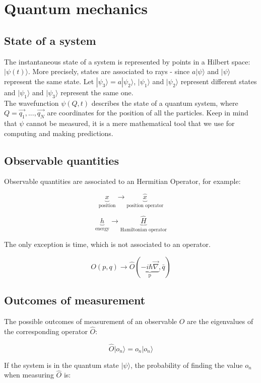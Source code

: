 \chapter{Quantum mechanics}

\section{State of a system}
The instantaneous state of a system is represented by points in a Hilbert space: $|\psi(t)\rangle$.
More precisely,  states are associated to rays - since $a|\psi\rangle$ and $|\psi\rangle$ represent the same state.
Let $|\psi_3\rangle = a |\psi_2\rangle$, $|\psi_1\rangle$ and $|\psi_2\rangle$ represent different states and $|\psi_1\rangle$ and $|\psi_3\rangle$ represent the same one.\\
\noindent
The wavefunction $\psi(Q,t)$ describes the state of a quantum system, where $Q=\vec{q_1},...,\vec{q_N}$ are coordinates for the position of all the particles. 
Keep in mind that $\psi$ cannot be measured, it is a mere mathematical tool that we use for computing and making predictions.

\section{Observable quantities}
Observable quantities are associated to an Hermitian Operator, for example:

$$\underbrace{x}_{\text{position}}\rightarrow\underbrace{\hat{x}}_{\text{position operator}}$$

$$\underbrace{h}_{\text{energy}}\rightarrow\underbrace{\hat{H}}_{\text{Hamiltonian operator}}$$

The only exception is time, which is not associated to an operator. 

$$O(p,q)\rightarrow\hat{O}(\underbrace{-i\hbar\vec{\nabla}}_{\text{p}},\bar{q})$$

\section{Outcomes of measurement}
The possible outcomes of measurement of an observable $O$ are the eigenvalues of the corresponding operator $\hat{O}$:

$$\hat{O}|o_n\rangle = o_n|o_n\rangle$$

If the system is in the quantum state $|\psi\rangle$, the probability of finding the value $o_n$ when measuring $\hat{O}$ is:

